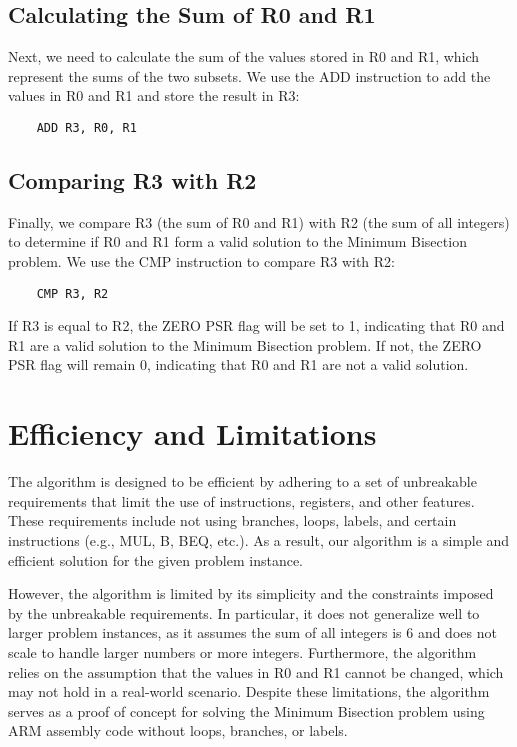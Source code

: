 \subsection{Calculating the Sum of R0 and R1}

Next, we need to calculate the sum of the values stored in R0 and R1, which represent the sums of the two subsets. We use the ADD instruction to add the values in R0 and R1 and store the result in R3:

\begin{verbatim}
    ADD R3, R0, R1
\end{verbatim}

\subsection{Comparing R3 with R2}

Finally, we compare R3 (the sum of R0 and R1) with R2 (the sum of all integers) to determine if R0 and R1 form a valid solution to the Minimum Bisection problem. We use the CMP instruction to compare R3 with R2:

\begin{verbatim}
    CMP R3, R2
\end{verbatim}

If R3 is equal to R2, the ZERO PSR flag will be set to 1, indicating that R0 and R1 are a valid solution to the Minimum Bisection problem. If not, the ZERO PSR flag will remain 0, indicating that R0 and R1 are not a valid solution.

\section{Efficiency and Limitations}

The algorithm is designed to be efficient by adhering to a set of unbreakable requirements that limit the use of instructions, registers, and other features. These requirements include not using branches, loops, labels, and certain instructions (e.g., MUL, B, BEQ, etc.). As a result, our algorithm is a simple and efficient solution for the given problem instance.

However, the algorithm is limited by its simplicity and the constraints imposed by the unbreakable requirements. In particular, it does not generalize well to larger problem instances, as it assumes the sum of all integers is 6 and does not scale to handle larger numbers or more integers. Furthermore, the algorithm relies on the assumption that the values in R0 and R1 cannot be changed, which may not hold in a real-world scenario. Despite these limitations, the algorithm serves as a proof of concept for solving the Minimum Bisection problem using ARM assembly code without loops, branches, or labels.

